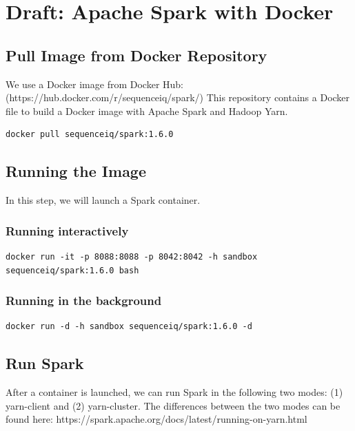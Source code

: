 
\FILENAME

\section{Draft: Apache Spark with Docker}\label{s:apache-spark-with-docker}

\subsection{Pull Image from Docker
Repository}

We use a Docker image from Docker Hub:
(https://hub.docker.com/r/sequenceiq/spark/) This repository contains a
Docker file to build a Docker image with Apache Spark and Hadoop Yarn.

\begin{lstlisting}
docker pull sequenceiq/spark:1.6.0
\end{lstlisting}

\subsection{Running the Image}

In this step, we will launch a Spark container.

\subsubsection{Running interactively}

\begin{lstlisting}
docker run -it -p 8088:8088 -p 8042:8042 -h sandbox sequenceiq/spark:1.6.0 bash
\end{lstlisting}

\subsubsection{Running in the
background}

\begin{lstlisting}
docker run -d -h sandbox sequenceiq/spark:1.6.0 -d
\end{lstlisting}

\subsection{Run Spark}

After a container is launched, we can run Spark in the following two
modes: (1) yarn-client and (2) yarn-cluster. The differences between the
two modes can be found here:
https://spark.apache.org/docs/latest/running-on-yarn.html


